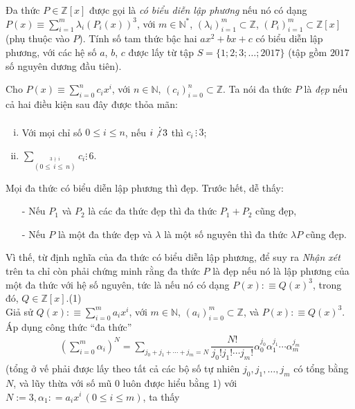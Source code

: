 \begin{bt}%
	Đa thức $P\in \mathbb{Z}[x]$ được gọi là \textit{có biểu diễn lập phương} nếu nó có dạng $P(x)\equiv \sum\limits_{i=1}^{m}\lambda_{i}(P_{i}(x))^{3}$, với $m\in \mathbb{N^{*}}$, $(\lambda_{i})_{i=1}^{m}\subset \mathbb{Z}$, $(P_{i})_{i=1}^{m}\subset \mathbb{Z}[x]$ (phụ thuộc vào $P$). Tính số tam thức bậc hai $ax^{2}+bx+c$ có biểu diễn lập phương, với các hệ số $a$, $b$, $c$ được lấy từ tập $S=\{1;2;3;\ldots;2017\}$ (tập gồm $2017$ số nguyên dương đầu tiên).
	\loigiai
	{
	Cho $P(x)\equiv \displaystyle\sum\limits_{i=0}^{n}c_{i}x^{i}$, với $n \in \mathbb{N}$,  $(c_{i})_{i=0}^{n}\subset \mathbb{Z}$. Ta nói đa thức $P$ là \textit{đẹp} nếu cả hai điều kiện sau đây được thỏa mãn:
	\begin{enumerate} [(i)]
		\item Với mọi chỉ số $0 \leq i \leq n$, nếu $i \not\vdots\,3$ thì $c_{i} \,\vdots\,3$;
		\item $\displaystyle\sum\limits_{\overset{3\, \nmid\,i}{(0\leq\, i \leq \,n)}{}}c_{i} \vdots\,6$. 
	\end{enumerate}	
	\nx Mọi đa thức có biểu diễn lập phương thì đẹp. 
	\cm
	Trước hết, dễ thấy: 
	\begin{itemize} 
		\item[-] Nếu $P_{1}$ và $P_{2}$ là các đa thức đẹp thì đa thức $P_{1}+P_{2}$ cũng đẹp,
		\item[-] Nếu $P$ là một đa thức đẹp và $\lambda$ là một số nguyên thì đa thức $\lambda P$ cũng đẹp.
	\end{itemize} Vì thế, từ định nghĩa của đa thức có biểu diễn lập phương, để suy ra \textit{Nhận xét} trên ta chỉ còn phải chứng minh rằng đa thức $P$ là đẹp nếu nó là lập phương của một đa thức với hệ số nguyên, tức là nếu nó có dạng $P(x):\equiv Q(x)^{3}$, trong đó, $Q\in \mathbb{Z}[x].$\hfill (1) 
	\\Giả sử $Q(x):\equiv \sum\limits_{i=0}^{m}a_{i}x^{i}$, với $m\in \mathbb{N}$, $(a_{i})_{i=0}^{m}\subset \mathbb{Z}$, và $P(x):\equiv Q(x)^{3}$. Áp dụng công thức ``đa thức'' \begin{align*}
	\left(\sum\limits_{i=0}^{m}\alpha_{i}\right)^{N}=\sum\limits_{j_{0}+j_{1}+\cdots+j_{m}=N}\dfrac{N!}{j_{0}!j_{1}!\cdots j_{m}!}\alpha_{0}^{j_{0}}\alpha_{1}^{j_{1}}\cdots\alpha_{m}^{j_{m}} \end{align*} (tổng ở vế phải được lấy theo tất cả các bộ số tự nhiên $j_{0}, j_{1},\ldots,j_{m}$ có tổng bằng $N$, và lũy thừa với số mũ $0$ luôn được hiểu bằng $1$) với $N:=3, \alpha_{1}: = a_{i}x^{i} \, (0\leq i \leq m)$, ta thấy
}
\end{bt}
